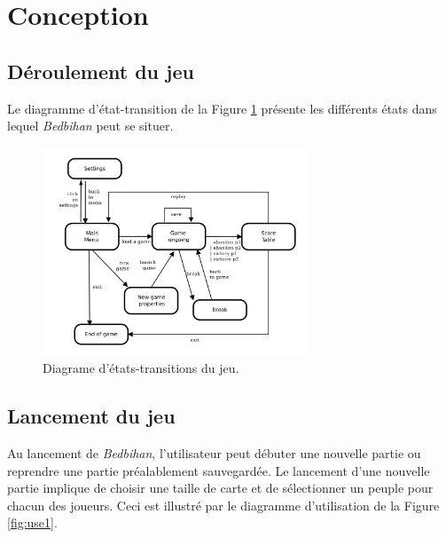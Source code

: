 \newpage
\section{Conception}
	
	\subsection{Déroulement du jeu}
	Le diagramme d'état-transition de la {\sc Figure} \ref{fig:transition_jeu} présente les différents états dans lequel \emph{Bedbihan} peut se situer.

		\begin{figure}[h]
			\begin{center}
				\includegraphics[width=0.7\textwidth]{figure/etat_transition.png}
			\end{center}
			\caption{Diagrame d'états-transitions du jeu.}
			\label{fig:transition_jeu}
		\end{figure}
	
		


		\subsection{Lancement du jeu}

		Au lancement de \emph{Bedbihan}, l'utilisateur peut débuter une nouvelle partie ou reprendre une partie préalablement sauvegardée. Le lancement d'une nouvelle partie implique de choisir une taille de carte et de sélectionner un peuple pour chacun des joueurs. Ceci est illustré par le diagramme d'utilisation de la {\sc Figure} \ref{fig:use1}.

